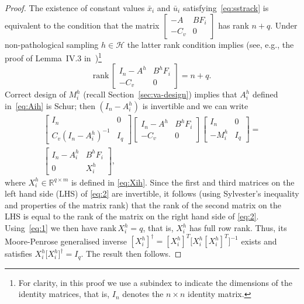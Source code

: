 \documentclass[letterpaper, 10 pt, conference]{ieeeconf}
\begin{document}
\begin{proof} The existence of constant values $\bar x_i$ and $\bar
  u_i$ satisfying~\eqref{eq:sstrack} is equivalent to the condition
  that the matrix $ \begin{bmatrix} -A & B F_i \\-C_v & 0
  \end{bmatrix}$ has rank $n+q$.  Under non-pathological sampling $h
  \in \mathcal{H}$ the latter rank condition implies (see, e.g., the
  proof of Lemma~IV.3 in~\cite{jemdav_tac03})\footnote{For clarity, in
    this proof we use a subindex to indicate the dimensions of the
    identity matrices, that is, $I_n$ denotes the $n\times n$ identity
    matrix.}
  \begin{equation}
    \label{eq:1}
    \mathrm{rank} \, \begin{bmatrix} I_n-A^h & B^h F_i \\-C_v & 0
  \end{bmatrix} = n+q.
  \end{equation}
  Correct design of $M_i^h$ (recall Section~\ref{sec:va-design})
  implies that $A_i^h$ defined in~\eqref{eq:Aih} is Schur; then
  $(I_n-A_i^h)$ is invertible and we can write
  \begin{multline}
    \label{eq:2}
    \begin{bmatrix}
      I_n& 0 \\ C_v (I_n-A_i^h)^{-1} & I_q
    \end{bmatrix} \begin{bmatrix} I_n  - A^h & B^h F
_i \\-C_v & 0
  \end{bmatrix}
  \begin{bmatrix}
    I_n & 0 \\-M_i^h & I_q
  \end{bmatrix} = \\
  \begin{bmatrix}
    I_n-A_i^h & B^h F_i \\ 0 & X_i^h
  \end{bmatrix},
  \end{multline}
  where $X_i^h \in \mathbb{R}^{q\times m}$ is defined in
  \eqref{eq:Xih}.  Since the first and third matrices on the left hand
  side (LHS) of \eqref{eq:2} are invertible, it follows (using
  Sylvester's inequality and properties of the matrix rank) that the
  rank of the second matrix on the LHS is equal to the rank of the
  matrix on the right hand side of \eqref{eq:2}.  Using~\eqref{eq:1}
  we then have $\mathrm{rank} \, X_i^h =q$, that is, $X_i^h$ has full
  row rank.  Thus, its Moore-Penrose generalised inverse
  $[X_i^h]^\dagger = [X_i^h]^T\big[X_i^h [X_i^h]^T\big]^{-1}$ exists
  and satisfies $X_i^h \big[ X_i^h \big]^\dagger = I_q$. The result
  then follows.
\end{proof}
\vspace{5mm} 
\end{document}
